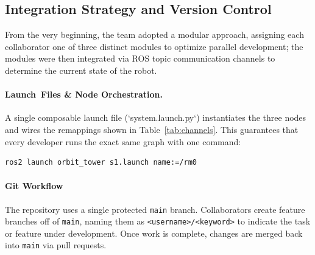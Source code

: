 \subsection{Integration Strategy and Version Control}

From the very beginning, the team adopted a modular approach, assigning each collaborator one of three distinct modules to optimize parallel development; the modules were then integrated via ROS topic communication channels to determine the current state of the robot.

\paragraph{Launch Files \& Node Orchestration.}
A single composable launch file (`system.launch.py`) instantiates the three nodes and wires the remappings shown in Table~\ref{tab:channels}. This guarantees that every developer runs the exact same graph with one command:
\begingroup\small
\begin{verbatim}
ros2 launch orbit_tower s1.launch name:=/rm0
\end{verbatim}
\endgroup

\paragraph{Git Workflow}
The repository uses a single protected \texttt{main} branch. Collaborators create feature branches off of \texttt{main}, naming them as \texttt{<username>/<keyword>} to indicate the task or feature under development. Once work is complete, changes are merged back into \texttt{main} via pull requests.


